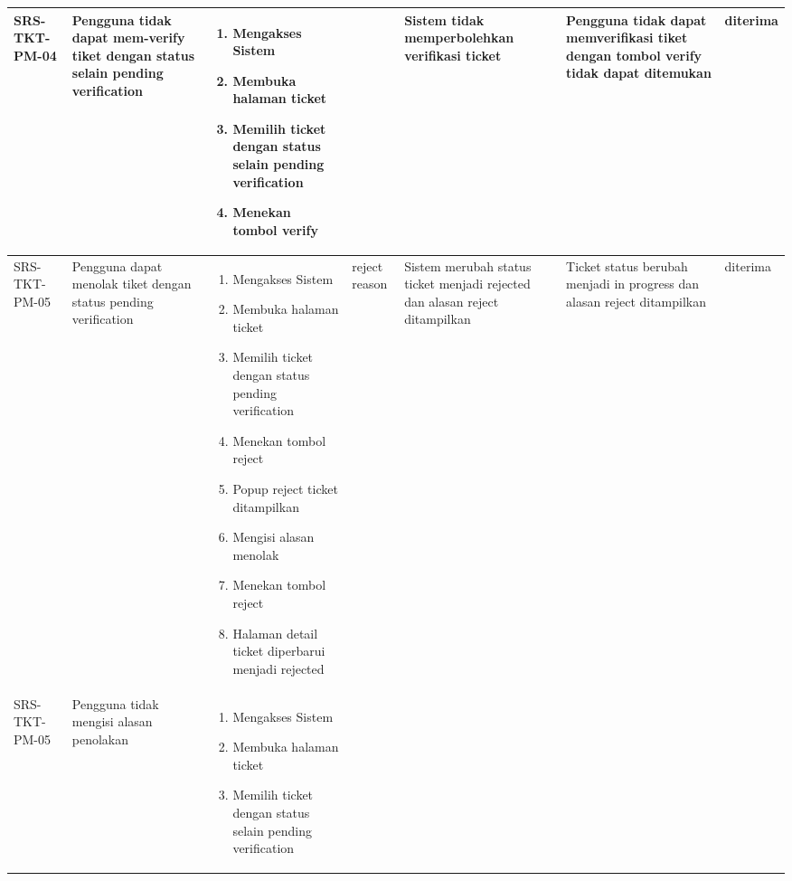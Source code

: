 \documentclass[12pt]{article}
\begin{document}
\begin{enumerate}[label=\textbf{5.\arabic*.}]
\begin{enumerate}[label=\textbf{5.2.\arabic*.}]
\begin{landscape}
\begin{longtable}{ |l|p{}|p{}|p{}|p{}|p{}|l| }
                \hline
                SRS-TKT-PM-04 & Pengguna tidak dapat mem-verify tiket dengan status selain pending verification & 
                \begin{enumerate}[label=\arabic*.] 
                    \item Mengakses Sistem
                    \item Membuka halaman ticket
                    \item Memilih ticket dengan status selain pending verification
                    \item Menekan tombol verify
                \end{enumerate} 
                &  & Sistem tidak memperbolehkan verifikasi ticket 
                & Pengguna tidak dapat memverifikasi tiket dengan tombol verify tidak dapat ditemukan & diterima \\
                \hline
                SRS-TKT-PM-05 & Pengguna dapat menolak tiket dengan status pending verification & 
                \begin{enumerate}[label=\arabic*.] 
                    \item Mengakses Sistem
                    \item Membuka halaman ticket
                    \item Memilih ticket dengan status pending verification
                    \item Menekan tombol reject
                    \item Popup reject ticket ditampilkan
                    \item Mengisi alasan menolak
                    \item Menekan tombol reject
                    \item Halaman detail ticket diperbarui menjadi rejected
                \end{enumerate} 
                & reject reason & Sistem merubah status ticket menjadi rejected dan alasan reject ditampilkan
                & Ticket status berubah menjadi in progress dan alasan reject ditampilkan& diterima \\
                \hline
                SRS-TKT-PM-05 & Pengguna tidak mengisi alasan penolakan & 
                \begin{enumerate}[label=\arabic*.] 
                    \item Mengakses Sistem
                    \item Membuka halaman ticket
                    \item Memilih ticket dengan status selain pending verification

\end{enumerate}
\end{longtable}
\end{landscape}
\end{enumerate}
\end{enumerate}
\end{document}

